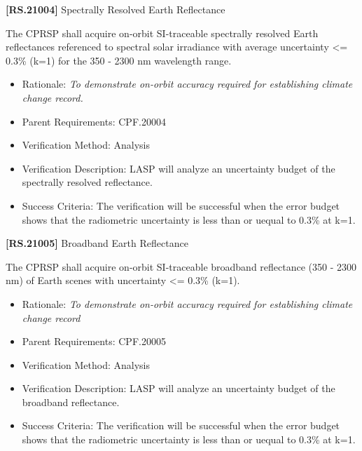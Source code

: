 \documentclass[12pt,oneside,oldfontcommands]{memoir}
\begin{document}
\textbf{[RS.21004]} Spectrally Resolved Earth Reflectance

The \gls{CPRSP} shall acquire on-orbit \gls{SI}-traceable spectrally resolved Earth reflectances referenced to spectral solar irradiance with average uncertainty <= 0.3\% (k=1) for the 350 - 2300 nm wavelength range.

\begin{itemize}
\item{} Rationale: \emph{To demonstrate on-orbit accuracy required for establishing climate change record.}

\item{} Parent Requirements: \gls{CPF}.20004

\item{} Verification Method: Analysis

\item{} Verification Description: \gls{LASP} will analyze an uncertainty budget of the spectrally resolved reflectance.

\item{} Success Criteria: The verification will be successful when the error budget shows that the radiometric uncertainty is less than or uequal to 0.3\% at k=1.

\end{itemize}

\textbf{[RS.21005]} Broadband Earth Reflectance

The \gls{CPRSP} shall acquire on-orbit \gls{SI}-traceable broadband reflectance (350 - 2300 nm) of Earth scenes with uncertainty <= 0.3\% (k=1).

\begin{itemize}
\item{} Rationale: \emph{To demonstrate on-orbit accuracy required for establishing climate change record}

\item{} Parent Requirements: \gls{CPF}.20005

\item{} Verification Method: Analysis

\item{} Verification Description: \gls{LASP} will analyze an uncertainty budget of the broadband reflectance.

\item{} Success Criteria: The verification will be successful when the error budget shows that the radiometric uncertainty is less than or uequal to 0.3\% at k=1.

\end{itemize}
\end{document}
